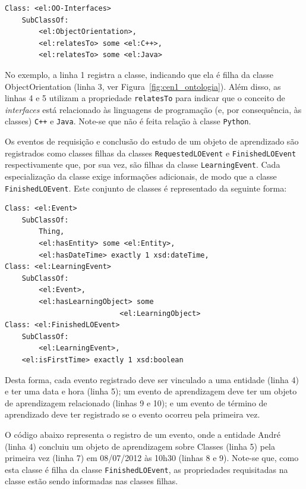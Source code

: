 \documentclass[times, 10pt, twocolumn]{article}
\begin{document}
\begin{code}
\begin{lstlisting}
Class: <el:OO-Interfaces>
    SubClassOf: 
        <el:ObjectOrientation>,
        <el:relatesTo> some <el:C++>,
        <el:relatesTo> some <el:Java>
\end{lstlisting}
\end{code}

No exemplo, a linha 1 registra a classe, indicando que ela é filha da classe ObjectOrientation (linha 3, ver Figura~\ref{fig:cen1_ontologia}). Além disso, as linhas 4 e 5 utilizam a propriedade {\tt relatesTo} para indicar que o conceito de {\em interfaces} está relacionado às linguagens de programação (e, por consequência, às classes) {\tt C++} e {\tt Java}. Note-se que não é feita relação à classe {\tt Python}.

Os eventos de requisição e conclusão do estudo de um objeto de aprendizado são registrados como classes filhas da classes {\tt RequestedLOEvent} e {\tt FinishedLOEvent} respectivamente que, por sua vez, são filhas da classe {\tt LearningEvent}. Cada especialização da classe exige informações adicionais, de modo que a classe {\tt FinishedLOEvent}. Este conjunto de classes é representado da seguinte forma:

\begin{code}
\begin{lstlisting}
Class: <el:Event>
    SubClassOf: 
        Thing,
        <el:hasEntity> some <el:Entity>,
        <el:hasDateTime> exactly 1 xsd:dateTime,
Class: <el:LearningEvent>
    SubClassOf: 
        <el:Event>,
        <el:hasLearningObject> some 
	                       <el:LearningObject>
Class: <el:FinishedLOEvent>
    SubClassOf: 
        <el:LearningEvent>,
	<el:isFirstTime> exactly 1 xsd:boolean
\end{lstlisting}
\end{code}

Desta forma, cada evento registrado deve ser vinculado a uma entidade (linha 4) e ter uma data e hora (linha 5); um evento de aprendizagem deve ter um objeto de aprendizagem relacionado (linhas 9 e 10); e um evento de término de aprendizado deve ter registrado se o evento ocorreu pela primeira vez.

O código abaixo representa o registro de um evento, onde a entidade André (linha 4) concluiu um objeto de aprendizagem sobre Classes (linha 5) pela primeira vez (linha 7) em 08/07/2012 às 10h30 (linhas 8 e 9). Note-se que, como esta classe é filha da classe {\tt FinishedLOEvent}, as propriedades requisitadas na classe estão sendo informadas nas classes filhas.
\end{document}
